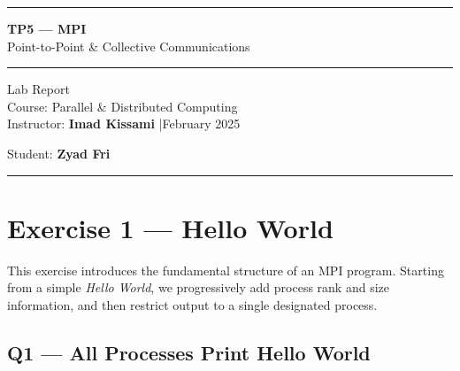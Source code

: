 \documentclass[12pt,a4paper]{article}
\begin{document}
\thispagestyle{empty}

\vspace*{3cm}
\begin{center}
  {\color{primarydark}\rule{\linewidth}{2pt}}
  \vspace{0.8cm}

  {\fontsize{26}{32}\selectfont\bfseries\color{primarydark}
    TP5 — MPI}\\[0.4em]
  {\Large\color{primary} Point-to-Point \& Collective Communications}

  \vspace{0.6cm}
  {\color{primarydark}\rule{\linewidth}{2pt}}
  \vspace{1.2cm}

  {\large Lab Report}\\[0.3em]
  {\normalsize\color{rulegray} Course: Parallel \& Distributed Computing}\\[0.2em]
  {\normalsize\color{rulegray} Instructor: \textbf{Imad Kissami} \quad|\quad February 2025}

  \vspace{1.5cm}
  {\large Student: \textbf{Zyad Fri}}

  \vspace{2cm}
  {\color{rulegray}\rule{0.6\linewidth}{0.5pt}}
\end{center}

\newpage
\thispagestyle{empty}
\tableofcontents
\newpage

\section{Exercise 1 — Hello World}

This exercise introduces the fundamental structure of an MPI program.
Starting from a simple \textit{Hello World}, we progressively add process
rank and size information, and then restrict output to a single designated
process.

\subsection{Q1 — All Processes Print Hello World}
\end{document}
